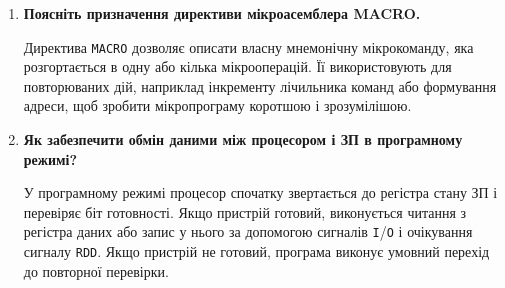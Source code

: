 \documentclass[12pt,a4paper]{article}
\begin{document}
\begin{enumerate}
    \item \textbf{Поясніть призначення директиви мікроасемблера MACRO.}

    Директива \texttt{MACRO} дозволяє описати власну мнемонічну мікрокоманду,
    яка розгортається в одну або кілька мікрооперацій. Її використовують для
    повторюваних дій, наприклад інкременту лічильника команд або формування
    адреси, щоб зробити мікропрограму коротшою і зрозумілішою.

    \item \textbf{Як забезпечити обмін даними між процесором і ЗП в програмному режимі?}

    У програмному режимі процесор спочатку звертається до регістра стану ЗП і
    перевіряє біт готовності. Якщо пристрій готовий, виконується читання з
    регістра даних або запис у нього за допомогою сигналів \texttt{I}/\texttt{O}
    і очікування сигналу \texttt{RDD}. Якщо пристрій не готовий, програма виконує
    умовний перехід до повторної перевірки.
\end{enumerate}
\end{document}

